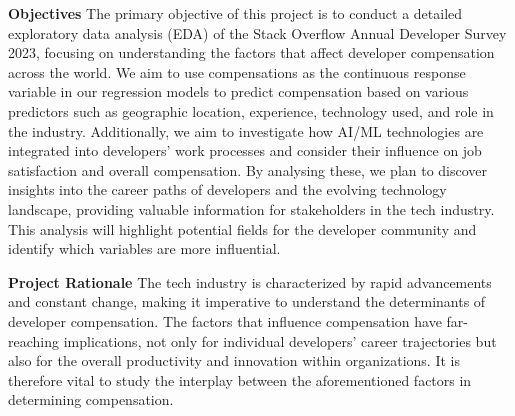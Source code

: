 \documentclass[
  12pt,
]{article}
\begin{document}
\textbf{Objectives} The primary objective of this project is to conduct
a detailed exploratory data analysis (EDA) of the Stack Overflow Annual
Developer Survey 2023, focusing on understanding the factors that affect
developer compensation across the world. We aim to use compensations as
the continuous response variable in our regression models to predict
compensation based on various predictors such as geographic location,
experience, technology used, and role in the industry. Additionally, we
aim to investigate how AI/ML technologies are integrated into
developers' work processes and consider their influence on job
satisfaction and overall compensation. By analysing these, we plan to
discover insights into the career paths of developers and the evolving
technology landscape, providing valuable information for stakeholders in
the tech industry. This analysis will highlight potential fields for the
developer community and identify which variables are more influential.

\textbf{Project Rationale} The tech industry is characterized by rapid
advancements and constant change, making it imperative to understand the
determinants of developer compensation. The factors that influence
compensation have far-reaching implications, not only for individual
developers' career trajectories but also for the overall productivity
and innovation within organizations. It is therefore vital to study the
interplay between the aforementioned factors in determining
compensation.
\end{document}
